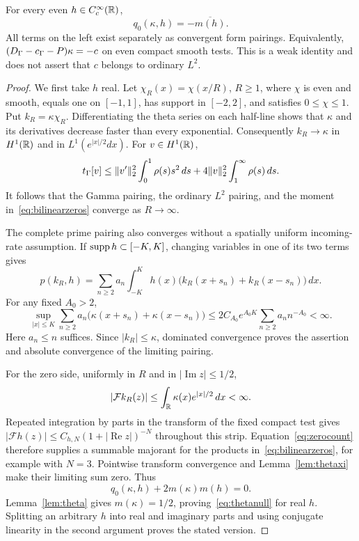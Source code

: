\begin{proposition}\label{prop:thetanull}
For every even $h\in C_c^\infty(\mathbb R)$,
\begin{equation}\label{eq:thetanull}
 q_0(\kappa,h)=-\overline{m(h)}.
\end{equation}
All terms on the left exist separately as convergent form pairings. Equivalently, $(D_\Gamma-c_\Gamma-P)\kappa=-c$ on even compact smooth tests. This is a weak identity and does not assert that $c$ belongs to ordinary $L^2$.
\end{proposition}
\begin{proof}
We first take $h$ real. Let $\chi_R(x)=\chi(x/R)$, $R\ge1$, where $\chi$ is even and smooth, equals one on $[-1,1]$, has support in $[-2,2]$, and satisfies $0\le\chi\le1$. Put $k_R=\kappa\chi_R$. Differentiating the theta series on each half-line shows that $\kappa$ and its derivatives decrease faster than every exponential. Consequently $k_R\to\kappa$ in $H^1(\mathbb R)$ and in $L^1(e^{|x|/2}dx)$. For $v\in H^1(\mathbb R)$,
\[
 t_\Gamma[v]\le\lVert v'\rVert_2^2\int_0^1\rho(s)s^2\,ds
              +4\lVert v\rVert_2^2\int_1^\infty\rho(s)\,ds.
\]
It follows that the Gamma pairing, the ordinary $L^2$ pairing, and the moment in~\eqref{eq:bilinearzeros} converge as $R\to\infty$.

The complete prime pairing also converges without a spatially uniform incoming-rate assumption. If $\operatorname{supp} h\subset[-K,K]$, changing variables in one of its two terms gives
\[
 p(k_R,h)=\sum_{n\ge2}a_n\int_{-K}^K h(x)
           \bigl(k_R(x+s_n)+k_R(x-s_n)\bigr)\,dx.
\]
For any fixed $A_0>2$,
\begin{equation}\label{eq:bridgeprimerate}
 \sup_{|x|\le K}\sum_{n\ge2}a_n
       \bigl(\kappa(x+s_n)+\kappa(x-s_n)\bigr)
 \le2C_{A_0}e^{A_0K}\sum_{n\ge2}a_nn^{-A_0}<\infty.
\end{equation}
Here $a_n\le n$ suffices. Since $|k_R|\le\kappa$, dominated convergence proves the assertion and absolute convergence of the limiting pairing.

For the zero side, uniformly in $R$ and in $|\operatorname{Im}z|\le1/2$,
\[
 |\mathcal Fk_R(z)|\le\int_\mathbb R\kappa(x)e^{|x|/2}\,dx<\infty.
\]
Repeated integration by parts in the transform of the fixed compact test gives
$|\mathcal Fh(z)|\le C_{h,N}(1+|\operatorname{Re}z|)^{-N}$ throughout this strip. Equation~\eqref{eq:zerocount} therefore supplies a summable majorant for the products in~\eqref{eq:bilinearzeros}, for example with $N=3$. Pointwise transform convergence and Lemma~\ref{lem:thetaxi} make their limiting sum zero. Thus
\[
 q_0(\kappa,h)+2m(\kappa)m(h)=0.
\]
Lemma~\ref{lem:theta} gives $m(\kappa)=1/2$, proving~\eqref{eq:thetanull} for real $h$. Splitting an arbitrary $h$ into real and imaginary parts and using conjugate linearity in the second argument proves the stated version.
\end{proof}

